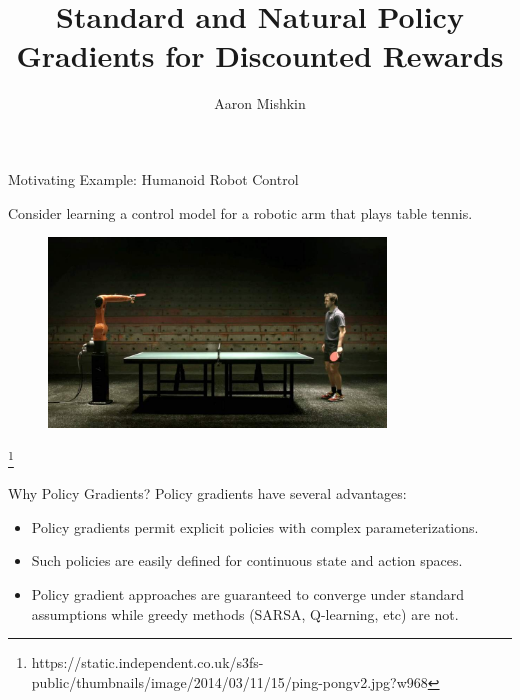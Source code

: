 \documentclass[]{beamer}
\title{Standard and Natural Policy Gradients for Discounted Rewards}
\author{Aaron Mishkin}
\institute{UBC MLRG 2018W1}
\begin{document}
\begin{frame}

    \titlepage

\end{frame}

\begin{frame}{Motivating Example: Humanoid Robot Control}

Consider learning a control model for a robotic arm that plays table tennis.

\begin{figure}
    \includegraphics[width=0.8\textwidth]{arm_tennis.jpg}
\end{figure}


{\let\thefootnote\relax\footnote{{\tiny https://static.independent.co.uk/s3fs-public/thumbnails/image/2014/03/11/15/ping-pongv2.jpg?w968}}}

\end{frame}

\begin{frame}{Why Policy Gradients?}
Policy gradients have several advantages:
\begin{itemize}
    \item Policy gradients permit explicit policies with complex parameterizations.
    \item Such policies are easily defined for continuous state and action spaces.
    \item Policy gradient approaches are guaranteed to converge under standard assumptions while greedy methods (SARSA, Q-learning, etc) are not.
\end{itemize}
\end{frame}
\end{document}
